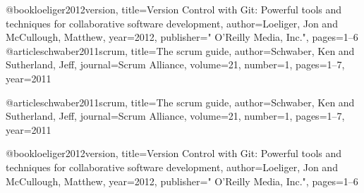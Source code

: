 @book{loeliger2012version,
  title={Version Control with Git: Powerful tools and techniques for collaborative software development},
  author={Loeliger, Jon and McCullough, Matthew},
  year={2012},
  publisher={" O'Reilly Media, Inc."},
  pages={1--6}
}
@article{schwaber2011scrum,
  title={The scrum guide},
  author={Schwaber, Ken and Sutherland, Jeff},
  journal={Scrum Alliance},
  volume={21},
  number={1},
  pages={1--7},
  year={2011}
}

\adjustmtc
\renewcommand\bibname{BIBLIOGRAPHIE}
\begin{thebibliography}{25}
\thispagestyle{MyStyle}

@article{schwaber2011scrum,
  title={The scrum guide},
  author={Schwaber, Ken and Sutherland, Jeff},
  journal={Scrum Alliance},
  volume={21},
  number={1},
  pages={1--7},
  year={2011}
}


@book{loeliger2012version,
  title={Version Control with Git: Powerful tools and techniques for collaborative software development},
  author={Loeliger, Jon and McCullough, Matthew},
  year={2012},
  publisher={" O'Reilly Media, Inc."},
  pages={1--6}
}
\end{thebibliography} 

